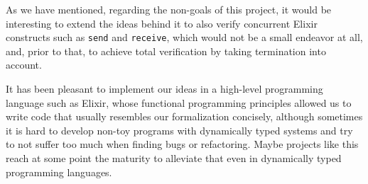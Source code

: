 As we have mentioned, regarding the non-goals of this project, it would be
interesting to extend the ideas behind it to also verify concurrent Elixir
constructs such as \verb|send| and \verb|receive|, which would not be a small
endeavor at all, and, prior to that, to achieve total verification by taking
termination into account.

It has been pleasant to implement our ideas in a high-level programming language
such as Elixir, whose functional programming principles allowed us to write code
that usually resembles our formalization concisely, although sometimes it is
hard to develop non-toy programs with dynamically typed systems and try to not 
suffer too much when finding bugs or refactoring. Maybe projects like this reach
at some point the maturity to alleviate that even in dynamically typed 
programming languages.
